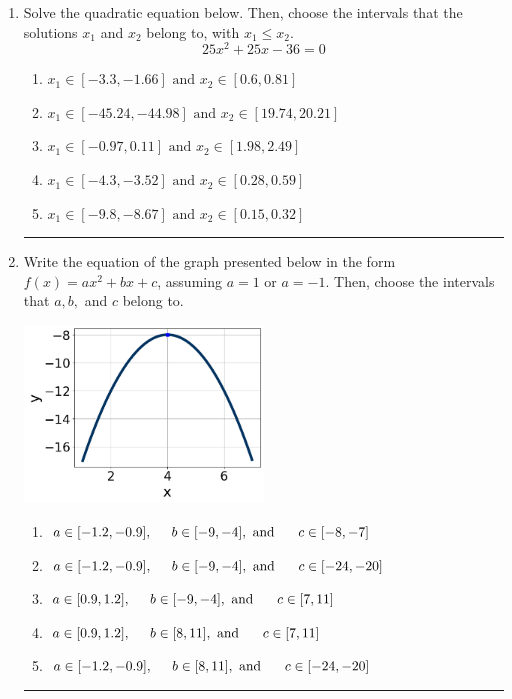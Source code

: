 \documentclass[14pt]{extbook}
\newcommand{\litem}[1]{\item#1\hspace*{-1cm}\rule{\textwidth}{0.4pt}}
\begin{document}
\begin{enumerate}
\litem{
Solve the quadratic equation below. Then, choose the intervals that the solutions $x_1$ and $x_2$ belong to, with $x_1 \leq x_2$.\[ 25x^{2} +25 x -36 = 0 \]\begin{enumerate}[label=\Alph*.]
\item \( x_1 \in [-3.3, -1.66] \text{ and } x_2 \in [0.6, 0.81] \)
\item \( x_1 \in [-45.24, -44.98] \text{ and } x_2 \in [19.74, 20.21] \)
\item \( x_1 \in [-0.97, 0.11] \text{ and } x_2 \in [1.98, 2.49] \)
\item \( x_1 \in [-4.3, -3.52] \text{ and } x_2 \in [0.28, 0.59] \)
\item \( x_1 \in [-9.8, -8.67] \text{ and } x_2 \in [0.15, 0.32] \)

\end{enumerate} }
\litem{
Write the equation of the graph presented below in the form $f(x)=ax^2+bx+c$, assuming  $a=1$ or $a=-1$. Then, choose the intervals that $a, b,$ and $c$ belong to.
\begin{center}
    \includegraphics[width=0.5\textwidth]{../Figures/quadraticGraphToEquationB.png}
\end{center}
\begin{enumerate}[label=\Alph*.]
\item \( a \in [-1.2, -0.9], \hspace*{5mm} b \in [-9, -4], \text{ and } \hspace*{5mm} c \in [-8, -7] \)
\item \( a \in [-1.2, -0.9], \hspace*{5mm} b \in [-9, -4], \text{ and } \hspace*{5mm} c \in [-24, -20] \)
\item \( a \in [0.9, 1.2], \hspace*{5mm} b \in [-9, -4], \text{ and } \hspace*{5mm} c \in [7, 11] \)
\item \( a \in [0.9, 1.2], \hspace*{5mm} b \in [8, 11], \text{ and } \hspace*{5mm} c \in [7, 11] \)
\item \( a \in [-1.2, -0.9], \hspace*{5mm} b \in [8, 11], \text{ and } \hspace*{5mm} c \in [-24, -20] \)


\end{enumerate}}
\end{enumerate}
\end{document}
